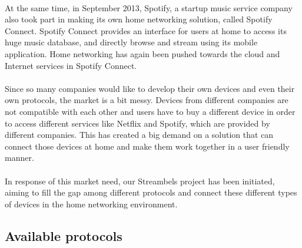 \\
At the same time, in September 2013, Spotify, a startup music service 
company also took part in making its own home networking solution, called 
Spotify Connect. Spotify Connect provides an interface for users at home to access its huge 
music database, and directly browse and stream using its mobile application. Home 
networking has again been pushed towards the cloud and Internet services in Spotify Connect. \\
\\
Since so many companies would like to develop their own devices and even their 
own protocols, the market is a bit messy. Devices from different companies are not compatible with each other and users have to buy a different device in order to access different services like Netflix and Spotify, which are provided by different companies.  This has created a big demand on a solution that can connect those devices at home and make them work together in a user friendly manner. \\
\\
In response of this market need, our Streambels project has been initiated, aiming to fill the gap among different protocols and connect these different types of devices in the home networking environment.
\subsection{Available protocols} 
